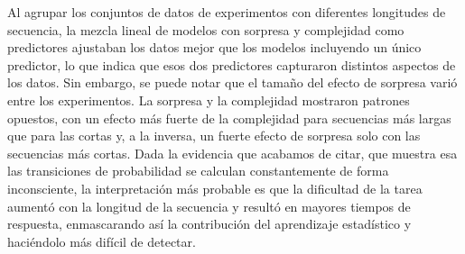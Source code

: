 Al agrupar los conjuntos de datos de experimentos con diferentes longitudes de secuencia, la mezcla lineal de modelos con sorpresa y complejidad como predictores ajustaban los datos mejor que los modelos incluyendo un único predictor, lo que indica que esos dos predictores capturaron distintos aspectos de los datos. Sin embargo, se puede notar que el tamaño del efecto de sorpresa varió entre los experimentos. La sorpresa y la complejidad mostraron patrones opuestos, con un efecto más fuerte de la complejidad para secuencias más largas que para las cortas y, a la inversa, un fuerte efecto de sorpresa solo con las secuencias más cortas. Dada la evidencia que acabamos de citar, que muestra esa las transiciones de probabilidad se calculan constantemente de forma inconsciente, la interpretación más probable es que la dificultad de la tarea aumentó con la longitud de la secuencia y resultó en mayores tiempos de respuesta, enmascarando así la contribución del aprendizaje estadístico y haciéndolo más difícil de detectar. 

